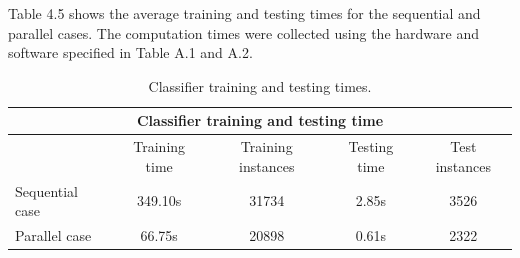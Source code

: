 Table 4.5 shows the average training and testing times for the sequential and parallel cases. The computation times were collected using the hardware and software specified in Table A.1 and A.2.

\begin{table}[H]
 \centering
    \begin{tabular}{| l | c | c | c | c |}
    \hline
    \multicolumn{5}{|c|}{Classifier training and testing time} \\
    \hline
    \hline
     & Training time & Training instances & Testing time & Test instances\\ \hline
    Sequential case & 349.10s & 31734 & 2.85s & 3526\\ \hline
    Parallel case & 66.75s & 20898 & 0.61s & 2322\\ \hline
   \end{tabular}
   \caption{Classifier training and testing times.}
   \label{tab:tnttime}
\end{table}
